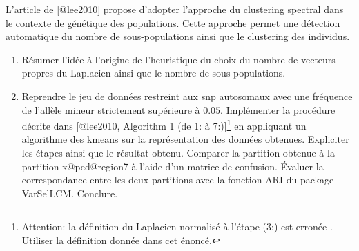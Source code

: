 \documentclass[11pt,]{article}
\begin{document}
L'article de {[}@lee2010{]} propose d'adopter l'approche du clustering
spectral dans le contexte de génétique des populations. Cette approche
permet une détection automatique du nombre de sous-populations ainsi que
le clustering des individus.

\begin{enumerate}
\def\labelenumi{\alph{enumi}.}
\setcounter{enumi}{6}
\item
  Résumer l'idée à l'origine de l'heuristique du choix du nombre de
  vecteurs propres du Laplacien ainsi que le nombre de sous-populations.
\item
  Reprendre le jeu de données restreint aux snp autosomaux avec une
  fréquence de l'allèle mineur strictement supérieure à \(0.05\).
  Implémenter la procédure décrite dans {[}@lee2010, Algorithm 1 (de 1:
  à 7:){]}\footnote{Attention: la définition du Laplacien normalisé à
    l'étape (3:) est erronée . Utiliser la définition donnée dans cet
    énoncé.} en appliquant un algorithme des \textsf{kmeans} sur la
  représentation des données obtenues. Expliciter les étapes ainsi que
  le résultat obtenu. Comparer la partition obtenue à la partition
  \textsf{x@ped@region7} à l'aide d'un matrice de confusion. Évaluer la
  correspondance entre les deux partitions avec la fonction \textsf{ARI}
  du package \textsf{VarSelLCM}. Conclure.
\end{enumerate}
\end{document}
